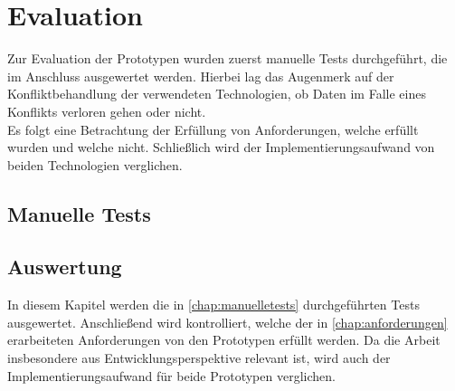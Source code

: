 \chapter{\label{chap:evaluation}Evaluation}
Zur Evaluation der Prototypen wurden zuerst manuelle Tests durchgeführt, die im Anschluss ausgewertet werden. 
Hierbei lag das Augenmerk auf der Konfliktbehandlung der verwendeten Technologien, ob Daten im Falle eines Konflikts verloren gehen oder nicht.\\
Es folgt eine Betrachtung der Erfüllung von Anforderungen, welche erfüllt wurden und welche nicht.
Schließlich wird der Implementierungsaufwand von beiden Technologien verglichen.
%
%
\section{\label{chap:manuelletests}Manuelle Tests}

%
%
\section{\label{chap:auswertung}Auswertung}
In diesem Kapitel werden die in \autoref{chap:manuelletests} durchgeführten Tests ausgewertet.
Anschließend wird kontrolliert, welche der in \autoref{chap:anforderungen} erarbeiteten Anforderungen von den Prototypen erfüllt werden.
Da die Arbeit insbesondere aus Entwicklungsperspektive relevant ist, wird auch der Implementierungsaufwand für beide Prototypen verglichen.
